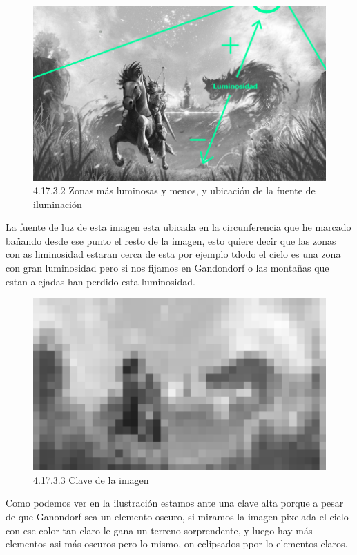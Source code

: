 \documentclass[12pt]{article}
\begin{document}
        \begin{figure}[H]
          \centering
          \includegraphics[scale=0.7]{images/Saúl/Sección 17/EA_img17_3Claroscuro_2Luminosidad.png}
          \caption{\small 4.17.3.2 Zonas más luminosas y menos, y ubicación de la fuente de iluminación}
        \end{figure}
        La fuente de luz de esta imagen esta ubicada en la circunferencia que he marcado bañando desde ese punto el resto de la imagen, esto quiere decir que las zonas con as liminosidad estaran cerca de esta por ejemplo tdodo el cielo es una zona con gran luminosidad pero si nos fijamos en Gandondorf o las montañas que estan alejadas han perdido esta luminosidad.


        \begin{figure}[H]
          \centering
          \includegraphics[scale=0.7]{images/Saúl/Sección 17/EA_img17_3Claroscuro_3Clave.png}
          \caption{\small 4.17.3.3 Clave de la imagen}
        \end{figure}
        Como podemos ver en la ilustración estamos ante una clave alta porque a pesar de que Ganondorf sea un elemento oscuro, si miramos la imagen pixelada el cielo con ese color tan claro le gana un terreno sorprendente, y luego hay más elementos asi más oscuros pero lo mismo, on eclipsados ppor lo elementos claros.
\end{document}
